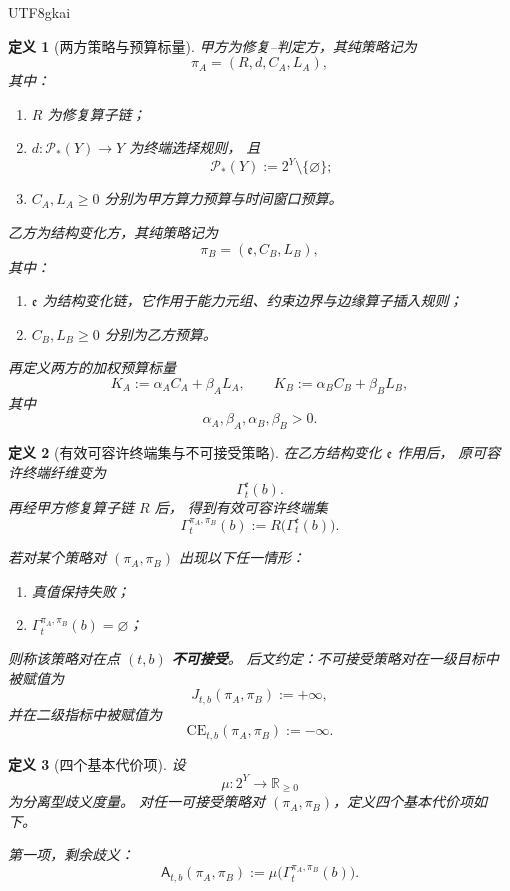 \documentclass[12pt]{article}
\newtheorem{definition}{定义}[section]
\newcommand{\RR}{\mathbb{R}}
\begin{document}
\begin{CJK*}{UTF8}{gkai}
\begin{definition}[两方策略与预算标量]
甲方为修复--判定方，其纯策略记为
\[
  \pi_A=(R,d,C_A,L_A),
\]
其中：
\begin{enumerate}
  \item $R$ 为修复算子链；
  \item $d:\mathcal P_\ast(Y)\to Y$ 为终端选择规则，
        且
        \[
          \mathcal P_\ast(Y):=2^Y\setminus\{\varnothing\};
        \]
  \item $C_A,L_A\ge 0$ 分别为甲方算力预算与时间窗口预算。
\end{enumerate}

乙方为结构变化方，其纯策略记为
\[
  \pi_B=(\mathfrak e,C_B,L_B),
\]
其中：
\begin{enumerate}
  \item $\mathfrak e$ 为结构变化链，它作用于能力元组、约束边界与边缘算子插入规则；
  \item $C_B,L_B\ge 0$ 分别为乙方预算。
\end{enumerate}

再定义两方的加权预算标量
\[
  K_A:=\alpha_A C_A+\beta_A L_A,
  \qquad
  K_B:=\alpha_B C_B+\beta_B L_B,
\]
其中
\[
  \alpha_A,\beta_A,\alpha_B,\beta_B>0.
\]
\end{definition}

\begin{definition}[有效可容许终端集与不可接受策略]
\label{def:tex1-ch4-gamma}
在乙方结构变化 $\mathfrak e$ 作用后，
原可容许终端纤维变为
\[
  \Gamma_t^{\mathfrak e}(b).
\]
再经甲方修复算子链 $R$ 后，
得到有效可容许终端集
\[
  \Gamma_t^{\pi_A,\pi_B}(b)
  :=
  R\bigl(\Gamma_t^{\mathfrak e}(b)\bigr).
\]

若对某个策略对 $(\pi_A,\pi_B)$ 出现以下任一情形：
\begin{enumerate}
  \item 真值保持失败；
  \item $\Gamma_t^{\pi_A,\pi_B}(b)=\varnothing$；
\end{enumerate}
则称该策略对在点 $(t,b)$ \textbf{不可接受}。
后文约定：不可接受策略对在一级目标中被赋值为
\[
  J_{t,b}(\pi_A,\pi_B):=+\infty,
\]
并在二级指标中被赋值为
\[
  \mathrm{CE}_{t,b}(\pi_A,\pi_B):=-\infty.
\]
\end{definition}

\begin{definition}[四个基本代价项]
\label{def:tex1-ch4-cost}
设
\[
  \mu:2^Y\to\RR_{\ge 0}
\]
为分离型歧义度量。
对任一可接受策略对 $(\pi_A,\pi_B)$，定义四个基本代价项如下。

第一项，剩余歧义：
\[
  \mathsf A_{t,b}(\pi_A,\pi_B)
  :=
  \mu\bigl(\Gamma_t^{\pi_A,\pi_B}(b)\bigr).
\]


\end{definition}
\end{CJK*}
\end{document}
